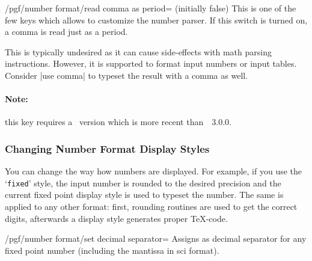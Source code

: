 \begin{key}{/pgf/number format/read comma as period= (initially false)}
    This is one of the few keys which allows to customize the number parser. If
    this switch is turned on, a comma is read just as a period.
\begin{codeexample}[pre={\begin{lateximage}},post={\end{lateximage}}]
\end{codeexample}
    This is typically undesired as it can cause side-effects with math parsing
    instructions. However, it is supported to format input numbers or input
    tables. Consider |use comma| to typeset the result with a comma as well.
\begin{codeexample}[pre={\begin{lateximage}},post={\end{lateximage}}]
\end{codeexample}

    \paragraph{Note:}

    this key requires a \pgfname\ version which is more recent
    than~\pgfname~3.0.0.
\end{key}


\subsubsection{Changing Number Format Display Styles}%
\label{sec:number:styles}

You can change the way how numbers are displayed. For example, if you use the
`\texttt{fixed}' style, the input number is rounded to the desired precision
and the current fixed point display style is used to typeset the number. The
same is applied to any other format: first, rounding routines are used to get
the correct digits, afterwards a display style generates proper \TeX{}-code.

\begin{key}{/pgf/number format/set decimal separator=}
    Assigns  as decimal separator for any fixed point number
    (including the mantissa in sci format).
\end{key}

